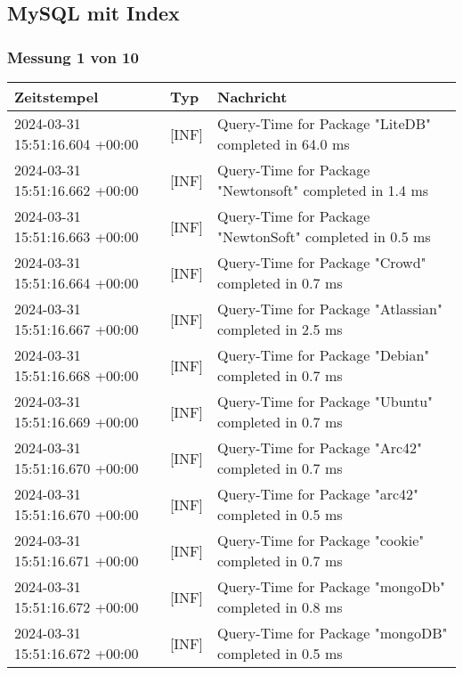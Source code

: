 \subsection{MySQL mit Index} \label{subsec:MySQLMitIndex}
    \subsubsection{Messung 1 von 10} \label{subsubsec:MySQLMitIndex1von10}
        {
            {\small
                \begin{tabularx}{\textwidth}{|l|l|X|}
                    \hline
                    \textbf{Zeitstempel} & \textbf{Typ} & \textbf{Nachricht} \\
                    \hline
                    \endhead
                    2024-03-31 15:51:16.604 +00:00 & [INF] & Query-Time for Package "LiteDB" completed in 64.0 ms \\
                    2024-03-31 15:51:16.662 +00:00 & [INF] & Query-Time for Package "Newtonsoft" completed in 1.4 ms \\
                    2024-03-31 15:51:16.663 +00:00 & [INF] & Query-Time for Package "NewtonSoft" completed in 0.5 ms \\
                    2024-03-31 15:51:16.664 +00:00 & [INF] & Query-Time for Package "Crowd" completed in 0.7 ms \\
                    2024-03-31 15:51:16.667 +00:00 & [INF] & Query-Time for Package "Atlassian" completed in 2.5 ms \\
                    2024-03-31 15:51:16.668 +00:00 & [INF] & Query-Time for Package "Debian" completed in 0.7 ms \\
                    2024-03-31 15:51:16.669 +00:00 & [INF] & Query-Time for Package "Ubuntu" completed in 0.7 ms \\
                    2024-03-31 15:51:16.670 +00:00 & [INF] & Query-Time for Package "Arc42" completed in 0.7 ms \\
                    2024-03-31 15:51:16.670 +00:00 & [INF] & Query-Time for Package "arc42" completed in 0.5 ms \\
                    2024-03-31 15:51:16.671 +00:00 & [INF] & Query-Time for Package "cookie" completed in 0.7 ms \\
                    2024-03-31 15:51:16.672 +00:00 & [INF] & Query-Time for Package "mongoDb" completed in 0.8 ms \\
                    2024-03-31 15:51:16.672 +00:00 & [INF] & Query-Time for Package "mongoDB" completed in 0.5 ms \\

\end{tabularx}}}
